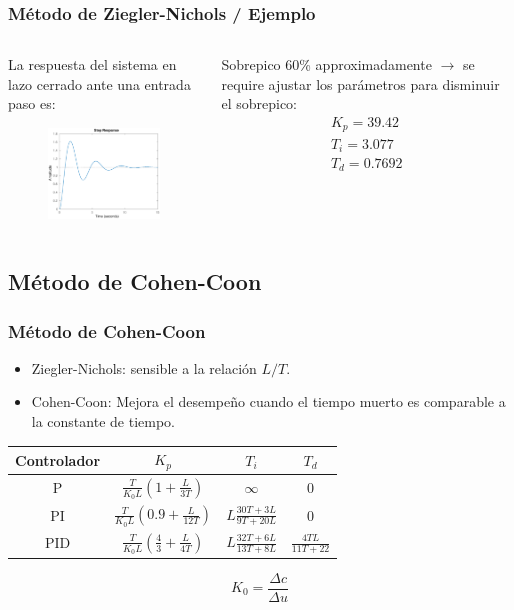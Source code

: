 \documentclass[aspectratio=169]{beamer}
\theoremstyle{definition}
\theoremstyle{plain}
\theoremstyle{remark}
\begin{document}
\begin{frame}[<+->]\frametitle{Método de Ziegler-Nichols / Ejemplo}
\vspace*{5mm}
\begin{columns}
\begin{column}{0.5\textwidth}
	La respuesta del sistema en lazo cerrado ante una entrada paso es:
	\begin{figure}
		\includegraphics[width=7cm]{images/ejemplo1Respuesta.eps}
	\end{figure}
\end{column}	
\begin{column}{0.5\textwidth}
	Sobrepico 60\% approximadamente $\rightarrow$ se require ajustar los parámetros para disminuir el sobrepico:
	\begin{align*}
		K_p = 39.42\\
		T_i = 3.077\\
		T_d = 0.7692
	\end{align*}
\end{column}	
\end{columns}
\end{frame}

\subsection{Método de Cohen-Coon}
\begin{frame}[<+->]\frametitle{Método de Cohen-Coon}
  \begin{itemize}
 		\item Ziegler-Nichols: sensible a la relación $L/T$.
   	\item Cohen-Coon: Mejora el desempeño cuando el tiempo muerto es comparable a la constante de tiempo.
  \end{itemize}
  \begin{table}
  	\begin{tabular}{c|c|c|c}
  		Controlador & $K_p$ & $T_i$ & $T_d$\\
  		\hline
  		P   & $\frac{T}{K_0 L}\left(1   + \frac{L}{3T} \right)$ & $\infty$ & 0\\
  		PI  & $\frac{T}{K_0 L}\left(0.9 + \frac{L}{12T} \right)$ & $L \frac{30T+3L}{9T+20L}$ & 0\\
  		PID & $\frac{T}{K_0 L}\left(\frac{4}{3} + \frac{L}{4T} \right)$ & $L \frac{32T+6L}{13T+8L}$ & $\frac{4TL}{11T+22}$
  	\end{tabular}
  \end{table}
  \begin{equation*}
  	K_0 = \frac{\Delta c}{\Delta u}
  \end{equation*}
\end{frame}
\end{document}
